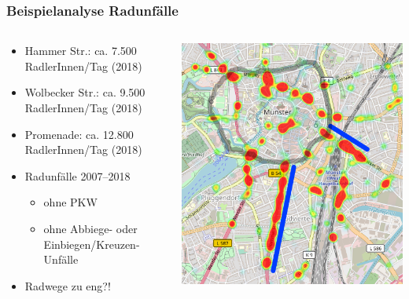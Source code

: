 \documentclass{beamer}
\begin{document}
\begin{frame}
  \frametitle{Beispielanalyse Radunfälle}
  \centering
  \begin{columns}
    \begin{column}{0.5\textwidth}
      \begin{itemize}
    \item {\color{blue} Hammer Str.: ca. 7.500 RadlerInnen/Tag (2018)}
    \item {\color{blue} Wolbecker Str.: ca. 9.500 RadlerInnen/Tag (2018)}
    \item Promenade: ca. 12.800 RadlerInnen/Tag (2018)
    \item Radunfälle 2007--2018
    \begin{itemize}
      \item ohne PKW
      \item ohne Abbiege- oder Einbiegen/Kreuzen-Unfälle
    \end{itemize}
    \item<2> Radwege zu eng?!
  \end{itemize}
    \end{column}
    \begin{column}{0.5\textwidth}
      \includegraphics[width=\textwidth]{img/radwege-unfaelle.png}
    \end{column}
  \end{columns} 
\end{frame}
\end{document}
